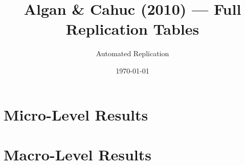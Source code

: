 \documentclass[11pt]{article}
\title{Algan \& Cahuc (2010) --- Full Replication Tables}
\author{Automated Replication}
\date{\today}
\begin{document}
\maketitle

\section*{Micro-Level Results}



\clearpage
\section*{Macro-Level Results}



\vspace{2em}



\clearpage


\end{document}
